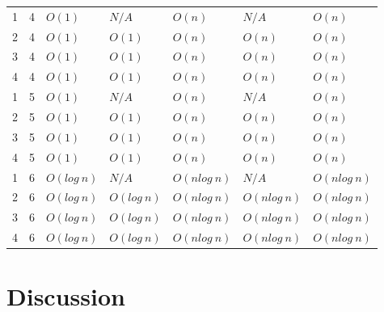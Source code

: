 \documentclass[12pt]{article}
\begin{document}
\begin{center}
\begin{tabularx}{\linewidth}{X X X X X X X}
        1 & 4 & $O(1)$      & $N/A$       & $O(n)$       & $N/A$        & $O(n)$       \\
        2 & 4 & $O(1)$      & $O(1)$      & $O(n)$       & $O(n)$       & $O(n)$       \\
        3 & 4 & $O(1)$      & $O(1)$      & $O(n)$       & $O(n)$       & $O(n)$       \\
        4 & 4 & $O(1)$      & $O(1)$      & $O(n)$       & $O(n)$       & $O(n)$       \\
        \hline

        1 & 5 & $O(1)$      & $N/A$       & $O(n)$       & $N/A$        & $O(n)$       \\
        2 & 5 & $O(1)$      & $O(1)$      & $O(n)$       & $O(n)$       & $O(n)$       \\
        3 & 5 & $O(1)$      & $O(1)$      & $O(n)$       & $O(n)$       & $O(n)$       \\
        4 & 5 & $O(1)$      & $O(1)$      & $O(n)$       & $O(n)$       & $O(n)$       \\
        \hline

        1 & 6 & $O(log\:n)$ & $N/A$       & $O(nlog\:n)$ & $N/A$        & $O(nlog\:n)$ \\
        2 & 6 & $O(log\:n)$ & $O(log\:n)$ & $O(nlog\:n)$ & $O(nlog\:n)$ & $O(nlog\:n)$ \\
        3 & 6 & $O(log\:n)$ & $O(log\:n)$ & $O(nlog\:n)$ & $O(nlog\:n)$ & $O(nlog\:n)$ \\
        4 & 6 & $O(log\:n)$ & $O(log\:n)$ & $O(nlog\:n)$ & $O(nlog\:n)$ & $O(nlog\:n)$
    \end{tabularx}
\end{center}


\section{Discussion}
\end{document}
